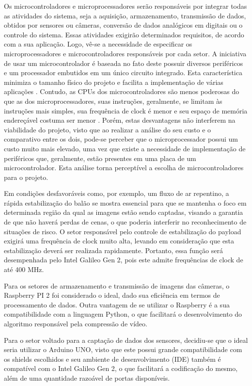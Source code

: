 Os microcontroladores e microprocessadores serão responsáveis por integrar todas as atividades do sistema, seja a aquisição, armazenamento, transmissão de dados, obtidos por sensores ou câmeras, conversão de dados analógicos em digitais ou o controle do sistema. Essas atividades exigirão determinados requisitos, de acordo com a sua aplicação. Logo, vê-se a necessidade de especificar os microprocessadores e microcontroladores responsáveis por cada setor. A iniciativa de usar um microcontrolador é baseada no fato deste possuir diversos periféricos e um processador embutidos em um único circuito integrado. Esta característica minimiza o tamanho físico do projeto e facilita a implementação de várias aplicações \cite{prado2009implementaccao}.  Contudo, as CPUs dos microcontroladores são menos poderosas do que as dos microprocessadores, suas instruções, geralmente, se limitam às instruções mais simples, sua frequência de clock é menor e seu espaço de memória endereçável costuma ser menor \cite{rucinski}. Porém, estas desvantagens não interferem na viabilidade do projeto, visto que ao realizar a análise do seu custo e o comparativo entre os dois, pode-se perceber que o microprocessador possui um custo muito mais elevado, uma vez que existe a necessidade de implementação de periféricos que, geralmente, estão presentes em uma placa de um microcontrolador. Esta análise torna perceptível a escolha de microcontroladores para o projeto.

Em condições desfavoráveis como, por exemplo, um fluxo de ar repentino, a rápida estabilização do balão se mostra essencial para que se mantenha o foco em determinada região da qual as imagens estão sendo captadas, visando a garantia de que não haverá perdas de cenas, o que poderia interferir no reconhecimento de situações de risco. O setor responsável pelo controle de estabilização do payload exigirá uma frequência de clock muito alta, levando em consideração que esta estabilização deverá ser realizada rapidamente. Portanto, essa função será desempenhada pelo Intel Galileo Gen 2, pois este admite frequências de clock de até 400 MHz.

Para os setores de armazenamento e transmissão de imagens das câmeras, o Raspberry PI 2 foi considerado o ideal, dado sua eficiência em termos de processamento de dados. Outra vantagem de se utilizar o Raspberry é a sua compatibilidade com a linguagem Python, o que facilitará o desenvolvimento do algoritmo responsável pela compressão de vídeo.

Para o setor voltado para a captação de dados dos sensores, decidiu-se que o ideal seria utilizar o Arduino UNO, visto que este possui grande compatibilidade com os shields escolhidos e seu ambiente de desenvolvimento (IDE) também é compatível com o Intel Galileo Gen 2, o que facilitará a codificação do mesmo, além de uma quantidade razoável de portas disponíveis.

